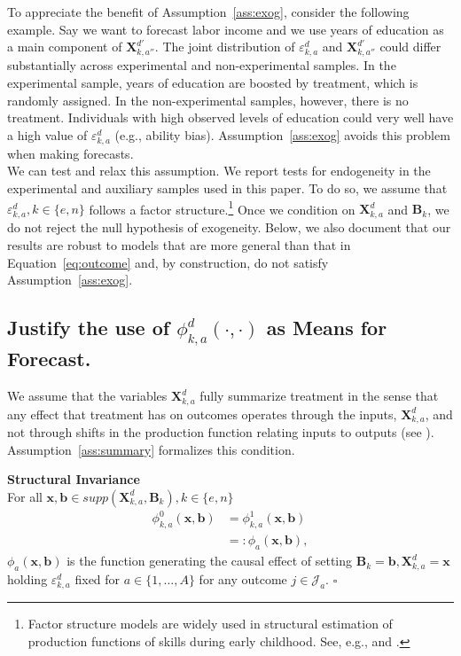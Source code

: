 \noindent To appreciate the benefit of Assumption~\ref{ass:exog}, consider the following example. Say we want to forecast labor income and we use years of education as a main component of $\bm{X}_{k,{a''}}^{d'}$. The joint distribution of $\varepsilon_{k,a}^d$ and $\bm{X}_{k,{a''}}^{d'}$ could differ substantially across experimental and non-experimental samples. In the experimental sample, years of education are boosted by treatment, which is randomly assigned. In the non-experimental samples, however, there is no treatment. Individuals with high observed levels of education could very well have a high value of  $\varepsilon_{k,a}^d$ (e.g., ability bias). Assumption~\ref{ass:exog} avoids this problem when making forecasts.\\

\noindent We can test and relax this assumption. We report tests for endogeneity in the experimental and auxiliary samples used in this paper. To do so, we assume that $\varepsilon_{k,a}^d, k \in \{e,n\}$ follows a factor structure.\footnote{Factor structure models are widely used in structural estimation of production functions of skills during early childhood. See, e.g., \citet{Cunha_Heckman_2008_JHR} and \citet{Cunha_Heckman_etal_2010_est_tech_cognoncog}.} Once we condition on $\bm{X}_{k,a}^d$ and $\bm{B}_{k}$, we do not reject the null hypothesis of exogeneity. Below, we also document that our results are robust to models that are more general than that in Equation~\eqref{eq:outcome} and, by construction, do not satisfy Assumption~\ref{ass:exog}.\\

\subsection{Justify the use of  $\phi^d_{k,a}\left( \cdot, \cdot \right)$ as Means for Forecast.}

\noindent We assume that the variables $\bm{X}_{k,a}^d$ fully summarize treatment in the sense that any effect that treatment has on outcomes operates through the inputs, $\bm{X}_{k,a}^d$, and not through shifts in the production function relating inputs to outputs (see \citealp{Heckman_Pinto_etal_2013_PerryFactor}). Assumption~\ref{ass:summary} formalizes this condition.

\begin{assumption} \label{ass:summary} \textbf{Structural Invariance}\\
For all $\bm{x}, \bm{b} \in supp(\bm{X}^d_{k,a}, \bm{B}_k), k \in \{e,n\}$
\begin{align}
\phi_{k,a}^0 \left( \bm{x}, \bm{b} \right) &= \phi_{k,a}^1 (\bm{x}, \bm{b}) \\   \nonumber                                                                     &=: \phi_{a} (\bm{x}, \bm{b}),
\end{align}
$\phi_{a}(\bm{x}, \bm{b})$ is the function generating the causal effect of setting $ \bm{B}_k=\bm{b}, \bm{X}^d_{k,a}=\bm{x}$ holding $\varepsilon^d_{k,a}$ fixed for $a \in \{1,\dots,A\}$ for any outcome $j \in \mathcal{J}_{a}$. $\square$
\end{assumption}

